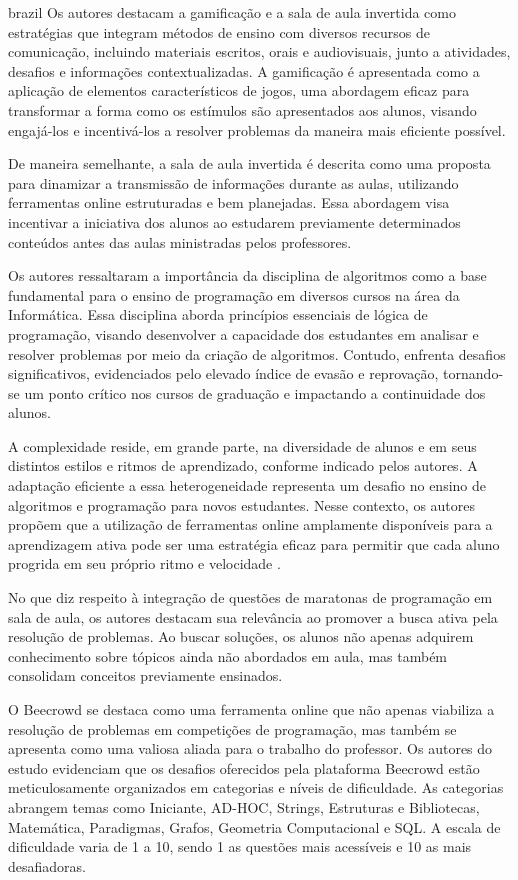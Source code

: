 \begin{otherlanguage*}{brazil}
Os autores destacam a gamificação e a sala de aula invertida como estratégias que integram métodos de ensino com diversos recursos de comunicação, incluindo materiais escritos, orais e audiovisuais, junto a atividades, desafios e informações contextualizadas. A gamificação é apresentada como a aplicação de elementos característicos de jogos, uma abordagem eficaz para transformar a forma como os estímulos são apresentados aos alunos, visando engajá-los e incentivá-los a resolver problemas da maneira mais eficiente possível. 

De maneira semelhante, a sala de aula invertida é descrita como uma proposta para dinamizar a transmissão de informações durante as aulas, utilizando ferramentas online estruturadas e bem planejadas. Essa abordagem visa incentivar a iniciativa dos alunos ao estudarem previamente determinados conteúdos antes das aulas ministradas pelos professores.

Os autores ressaltaram a importância da disciplina de algoritmos como a base fundamental para o ensino de programação em diversos cursos na área da Informática. Essa disciplina aborda princípios essenciais de lógica de programação, visando desenvolver a capacidade dos estudantes em analisar e resolver problemas por meio da criação de algoritmos. Contudo, enfrenta desafios significativos, evidenciados pelo elevado índice de evasão e reprovação, tornando-se um ponto crítico nos cursos de graduação e impactando a continuidade dos alunos. 

A complexidade reside, em grande parte, na diversidade de alunos e em seus distintos estilos e ritmos de aprendizado, conforme indicado pelos autores. A adaptação eficiente a essa heterogeneidade representa um desafio no ensino de algoritmos e programação para novos estudantes. Nesse contexto, os autores propõem que a utilização de ferramentas online amplamente disponíveis para a aprendizagem ativa pode ser uma estratégia eficaz para permitir que cada aluno progrida em seu próprio ritmo e velocidade \cite[p.~5]{cruz2022}. 

No que diz respeito à integração de questões de maratonas de programação em sala de aula, os autores destacam sua relevância ao promover a busca ativa pela resolução de problemas. Ao buscar soluções, os alunos não apenas adquirem conhecimento sobre tópicos ainda não abordados em aula, mas também consolidam conceitos previamente ensinados.

O Beecrowd se destaca como uma ferramenta online que não apenas viabiliza a resolução de problemas em competições de programação, mas também se apresenta como uma valiosa aliada para o trabalho do professor. Os autores do estudo evidenciam que os desafios oferecidos pela plataforma Beecrowd estão meticulosamente organizados em categorias e níveis de dificuldade. As categorias abrangem temas como Iniciante, AD-HOC, Strings, Estruturas e Bibliotecas, Matemática, Paradigmas, Grafos, Geometria Computacional e SQL. A escala de dificuldade varia de 1 a 10, sendo 1 as questões mais acessíveis e 10 as mais desafiadoras.


\end{otherlanguage*}
